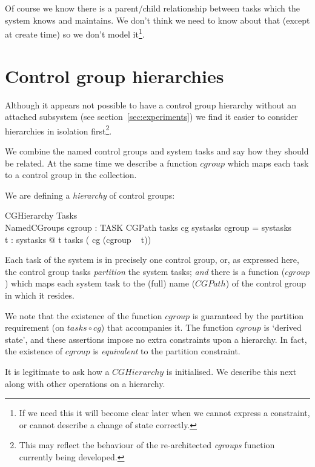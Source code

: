 \documentclass[a4paper,twoside,12pt]{article}
\begin{document}
Of course we know there is a parent/child relationship between tasks which the system knows and maintains.
We don't think we need to know about that (except at create time) so we don't model
it\footnote{If we need this it will become clear later when we cannot express a constraint,
or cannot describe a change of state correctly.}.

\section{Control group hierarchies}
\label{sec:cgh}

Although it appears not possible to have a control group hierarchy without an attached subsystem
(see section~\ref{sec:experiments}) we find it easier to consider hierarchies in isolation 
first\footnote{This may reflect the behaviour of the re-architected \emph{cgroups} function currently being developed.}.

We combine the named control groups and system tasks and say how they should be related.
At the same time we describe a function $cgroup$ which maps each task to a control group in the collection.

We are defining a \emph{hierarchy} of control groups:

\begin{schema}{CGHierarchy}
Tasks \\
NamedCGroups
\also
cgroup : TASK \ffun CGPath
\where
tasks \circ cg \partition systasks
\also
\dom cgroup = systasks \\
\forall t : systasks @ t \in tasks ( cg (cgroup ~ t))
\end{schema}
Each task of the system is in precisely one control group, or, as expressed here,
the control group tasks \emph{partition} the system tasks;
\emph{and} there is a function ($cgroup$) which maps each system task to the (full) name
($CGPath$) of the control group in which it resides.

We note that the existence of the function $cgroup$ is guaranteed by the partition requirement
(on $tasks \circ cg$) that accompanies it.
The function $cgroup$ is `derived state', and these assertions impose no extra constraints upon a hierarchy.
In fact, the existence of $cgroup$ is \emph{equivalent} to the partition constraint.

It is legitimate to ask how a $CGHierarchy$ is initialised.
We describe this next along with other operations on a hierarchy.
\end{document}
